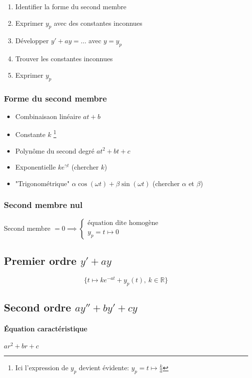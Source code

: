 \documentclass{article}
\newcommand{\R}{{\mathbb R}}
\begin{document}
\begin{enumerate}
	\item Identifier la forme du second membre
	\item Exprimer $y_p$ avec des constantes inconnues
	\item Développer $y' + ay = \ldots$ avec $y = y_p$
	\item Trouver les constantes inconnues
	\item Exprimer $y_p$
\end{enumerate}

\subsubsection{Forme du second membre}

\begin{itemize}
	\item Combinaisaon linéaire $at+b$
	\item Constante $k$ \footnote{Ici l'expression de $y_p$ devient évidente: $y_p = t\mapsto \frac{k}{a}$}
	\item Polynôme du second degré $at^2+bt+c$
	\item Exponentielle $ke^{\gamma t}$ (chercher $k$)
	\item "Trigonométrique" $\alpha \cos(\omega t) + \beta \sin(\omega t)$ (chercher $\alpha$ et $\beta$)
\end{itemize}


\subsubsection{Second membre nul}

Second membre $= 0 \implies \begin{cases}
	\text{équation dite homogène} \\
	y_p = t\mapsto 0
\end{cases}$


\subsection{Premier ordre $y' + ay$}

\[
	\{t\mapsto ke^{-at} + y_p(t),\ k\in \R\} 
\] 

\subsection{Second ordre $ay'' + by' + cy$}

\paragraph{Équation caractéristique} $ar^2 + br + c$
\end{document}
